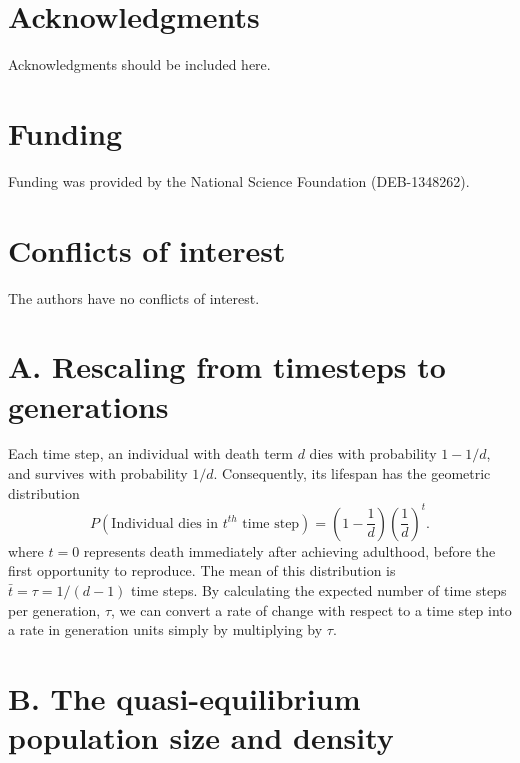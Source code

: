 \documentclass[9pt,twocolumn,twoside,lineno]{gsajnl}
\begin{document}
\section{Acknowledgments}
Acknowledgments should be included here.

\section{Funding}
Funding was provided by the National Science Foundation
(DEB-1348262).

\section{Conflicts of interest}
The authors have no conflicts of interest.

%
\footnotesize


\clearpage
\newpage
\onecolumn

\appendix

\section{A. Rescaling from timesteps to generations} \label{app:sec:generationTime}
Each time step, an individual with death term $d$ dies with probability $1-1/d$, and survives with probability $1/d$. Consequently, its lifespan has the geometric distribution
\[
    P(\text{Individual dies in $t^{th}$ time step}) = \left(1-\frac{1}{d}\right)\left(\frac{1}{d}\right)^t.
\]
where $t=0$ represents death immediately after achieving adulthood, before the first opportunity to reproduce. The mean of this distribution is $\bar{t} = \tau = 1/(d-1)$ time steps. By calculating the expected number of time steps per generation, $\tau$, we can convert a rate of change with respect to a time step into a rate in generation units simply by multiplying by $\tau$.

\section{B. The quasi-equilibrium population size and density}
\label{app:sec:quasi-equilibrium}
\end{document}
